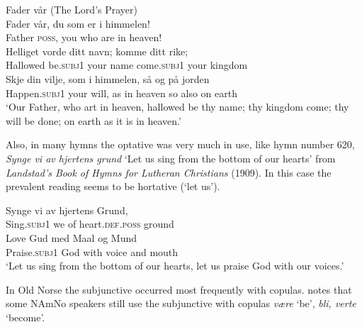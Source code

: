 \documentclass[output=paper]{langscibook}
\begin{document}
\ea%
    Fader vår  (The Lord’s Prayer)\label{ex:eide:4}\\
	\gll Fader vår, du som er i himmelen!\\
		 Father \textsc{poss}, you who are in heaven!\\
	\gll Helliget vorde ditt navn;    komme ditt rike;\\
	Hallowed be.\textsc{subj1} your name  come.\textsc{subj1} your kingdom\\
	\gll Skje din vilje,         som i himmelen, så og på jorden\\
	Happen.\textsc{subj1} your will,     as in heaven so also on earth\\
	\glt ‘Our Father, who art in heaven, hallowed be thy name; thy kingdom come; thy will be done; on earth as it is in heaven.’
\z



Also, in many hymns the optative was very much in use, like hymn number 620, \textit{Synge vi av hjertens grund} ‘Let us sing from the bottom of our hearts’ from \textit{Landstad’s Book of Hymns for Lutheran Christians} (1909). In this case the prevalent reading seems to be hortative (‘let us’).



\ea \gll  Synge vi av hjertens Grund,\\
		  Sing.\textsc{subj1} we of heart.\textsc{def.poss} ground\\
	\gll Love Gud med Maal og Mund\\
		Praise.\textsc{subj1} God with voice and mouth\\
	\glt  ‘Let us sing from the bottom of our hearts, let us praise God with our voices.’
\z



In Old Norse the subjunctive occurred most frequently with copulas. \citet{Hjelde1992} notes that some NAmNo speakers still use the subjunctive with copulas \textit{være} `be', \textit{bli, verte} ‘become’. 
\end{document}
